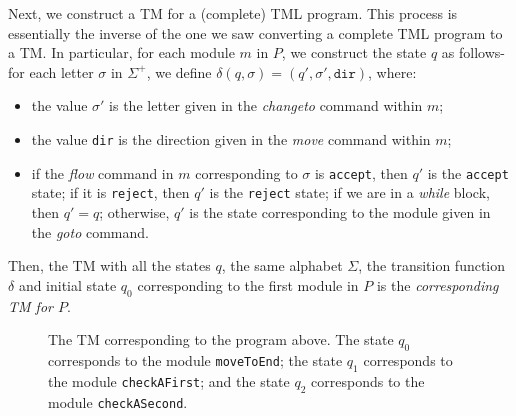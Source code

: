 \begin{appendices}
Next, we construct a TM for a (complete) TML program. This process is essentially the inverse of the one we saw converting a complete TML program to a TM. In particular, for each module $m$ in $P$, we construct the state $q$ as follows- for each letter $\sigma$ in $\Sigma^+$, we define $\delta(q, \sigma) = (q', \sigma', \texttt{dir})$, where:
\begin{itemize}
    \item the value $\sigma'$ is the letter given in the \textit{changeto} command within $m$;
    \item the value \texttt{dir} is the direction given in the \textit{move} command within $m$;
    \item if the \textit{flow} command in $m$ corresponding to $\sigma$ is \texttt{accept}, then $q'$ is the \texttt{accept} state; if it is \texttt{reject}, then $q'$ is the \texttt{reject} state; if we are in a \textit{while} block, then $q' = q$; otherwise, $q'$ is the state corresponding to the module given in the \textit{goto} command.
\end{itemize}
Then, the TM with all the states $q$, the same alphabet $\Sigma$, the transition function $\delta$ and initial state $q_0$ corresponding to the first module in $P$ is the \emph{corresponding TM for $P$}. 

\begin{figure}[htb]
    \centering
    \caption{The TM corresponding to the program above. The state $q_0$ corresponds to the module \texttt{moveToEnd}; the state $q_1$ corresponds to the module \texttt{checkAFirst}; and the state $q_2$ corresponds to the module \texttt{checkASecond}.}
    \label{fig:tm_from_tml}
\end{figure}


\end{appendices}

